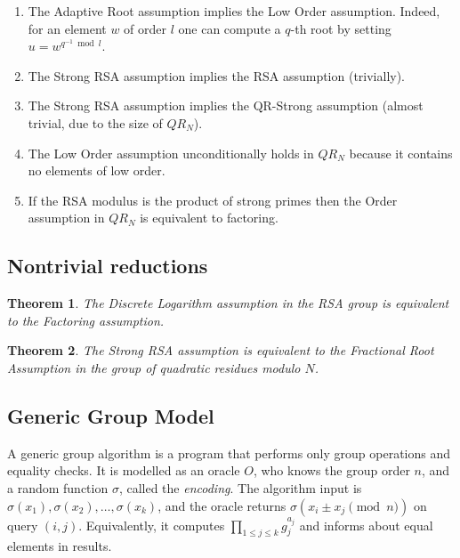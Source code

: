 \documentclass[a4paper]{article}
\newtheorem{theorem}{Theorem}
\begin{document}
\begin{enumerate}
    \item The Adaptive Root assumption implies the Low Order assumption. Indeed, for an element $w$ of order $l$ one can compute a $q$-th root by setting $u = w^{q^{-1}\bmod{l}}$. 
    \item The Strong RSA assumption implies the RSA assumption (trivially).
    \item The Strong RSA assumption implies the QR-Strong assumption (almost trivial, due to the size of $QR_N$).
    \item The Low Order assumption unconditionally holds in $QR_N$ because it contains no elements of low order.
    \item If the RSA modulus is the product of strong primes then the Order assumption in $QR_N$ is equivalent to factoring.
\end{enumerate}

\subsection{Nontrivial reductions}
\begin{theorem}\cite{bach1984discrete}
The Discrete Logarithm assumption in the RSA group is equivalent to the Factoring assumption.
\end{theorem}

\begin{theorem}\cite[Th. 1]{DBLP:conf/ccs/CramerS99}
The Strong RSA assumption is equivalent to the Fractional Root Assumption in the group of quadratic residues modulo $N$.
\end{theorem}

\subsection{Generic Group Model}

A generic group algorithm is a program that performs only group operations and equality checks. It is modelled as an oracle $O$, who knows the group order $n$, and a random function $\sigma$, called the \emph{encoding}. The algorithm input is $\sigma(x_1),\sigma(x_2),\ldots,\sigma(x_k)$, and the oracle returns $\sigma(x_i\pm x_j\pmod{n})$ on query $(i,j)$. Equivalently, it computes $\prod_{1\leq j \leq k}g_j^{a_j}$ and informs about equal elements in results.
\end{document}
